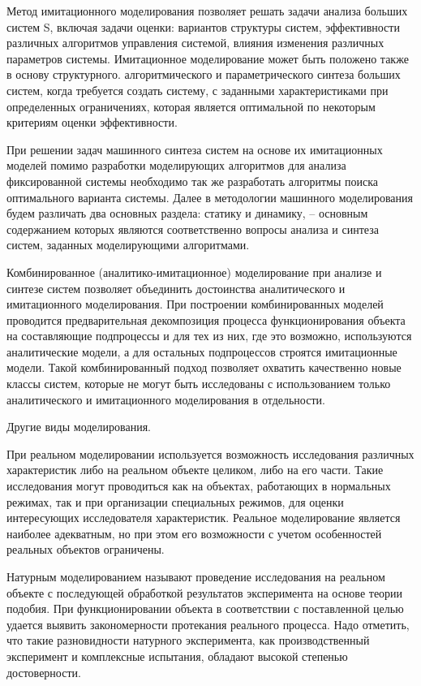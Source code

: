 \documentclass{article}
\begin{document}
    Метод имитационного моделирования позволяет решать задачи анализа больших систем S, включая задачи оценки: вариантов структуры систем, эффективности различных алгоритмов управления системой, влияния изменения различных параметров системы. Имитационное моделирование может быть положено также в основу структурного. алгоритмического и параметрического синтеза больших систем, когда требуется создать систему, с заданными характеристиками при определенных ограничениях, которая является оптимальной по некоторым критериям оценки эффективности.

    При решении задач машинного синтеза систем на основе их имитационных моделей помимо разработки моделирующих алгоритмов для анализа фиксированной системы необходимо так же разработать алгоритмы поиска оптимального варианта системы. Далее в методологии машинного моделирования будем различать два основных раздела: статику и динамику, -- основным содержанием которых являются соответственно вопросы анализа и синтеза систем, заданных моделирующими алгоритмами.

    Комбинированное (аналитико-имитационное) моделирование при анализе и синтезе систем позволяет объединить достоинства аналитического и имитационного моделирования. При построении комбинированных моделей проводится предварительная декомпозиция процесса функционирования объекта на составляющие подпроцессы и для тех из них, где это возможно, используются аналитические модели, а для остальных подпроцессов строятся имитационные модели. Такой комбинированный подход позволяет охватить качественно новые классы систем, которые не могут быть исследованы с использованием только аналитического и имитационного моделирования в отдельности.

    Другие виды моделирования.

    При реальном моделировании используется возможность исследования различных характеристик либо на реальном объекте целиком, либо на его части. Такие исследования могут проводиться как на объектах, работающих в нормальных режимах, так и при организации специальных режимов, для оценки интересующих исследователя характеристик. Реальное моделирование является наиболее адекватным, но при этом его возможности с учетом особенностей реальных объектов ограничены.

    Натурным моделированием называют проведение исследования на реальном объекте с последующей обработкой результатов эксперимента на основе теории подобия. При функционировании объекта в соответствии с поставленной целью удается выявить закономерности протекания реального процесса. Надо отметить, что такие разновидности натурного эксперимента, как производственный эксперимент и комплексные испытания, обладают высокой степенью достоверности.
\end{document}
